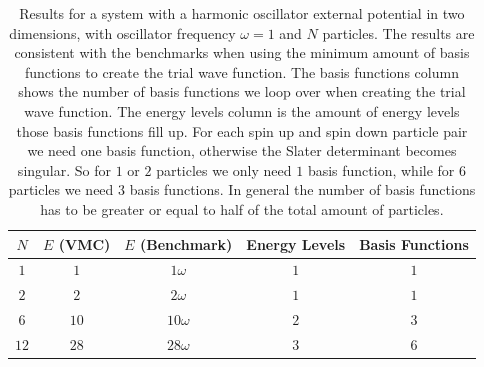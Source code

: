 \documentclass[../main.tex]{subfiles}
\begin{document}
\begin{table}[!ht]
  \centering
  \begin{tabular}{ | c | c | c | c | c | }
    \hline
    $N$ & $E$ (VMC) & $E$ (Benchmark) &  Energy Levels & Basis Functions\\*
    \hline
    $1$ & $1$ & $1\omega$ & $1$ & $1$ \\*
    \hline
    $2$ & $2$ & $2\omega$ & $1$ & $1$ \\*
    \hline
    $6$ & $10$ & $10\omega$ & $2$ & $3$ \\*
    \hline
    $12$ & $28$ & $28\omega$ & $3$ & $6$ \\*
    \hline
  \end{tabular}
  \caption{Results for a system with a harmonic oscillator external potential in two dimensions, with oscillator frequency $\omega = 1$ and $N$ particles. The results are consistent with the benchmarks when using the minimum amount of basis functions to create the trial wave function. The basis functions column shows the number of basis functions we loop over when creating the trial wave function. The energy levels column is the amount of energy levels those basis functions fill up. For each spin up and spin down particle pair we need one basis function, otherwise the Slater determinant becomes singular. So for $1$ or $2$ particles we only need $1$ basis function, while for $6$ particles we need $3$ basis functions. In general the number of basis functions has to be greater or equal to half of the total amount of particles.}
  \label{tab:RegHOTest2D}
\end{table}
\end{document}
